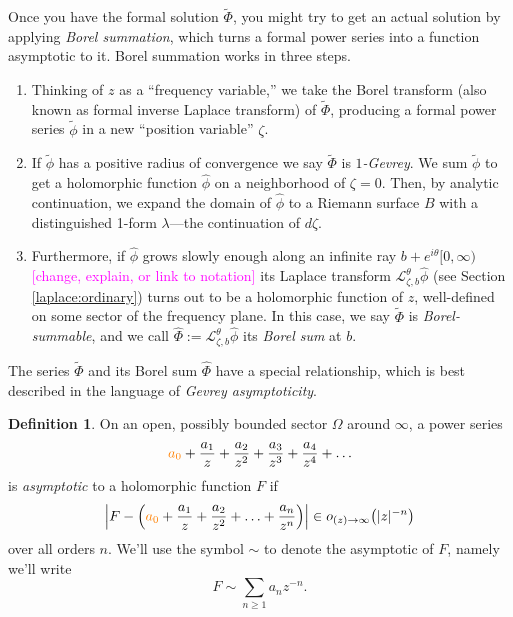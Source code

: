 \documentclass{article}
\let\Re\relax
\DeclareMathOperator{\Re}{Re}
\newcommand{\series}[1]{\tilde{#1}}
\newcommand{\laplace}{\mathcal{L}}
\theoremstyle{definition}
\newtheorem{defn}{Definition}
\theoremstyle{plain}
\begin{document}
Once you have the formal solution $\series{\Phi}$, you might try to get an actual solution by applying {\em Borel summation}, which turns a formal power series into a function asymptotic to it. Borel summation works in three steps.
\begin{enumerate}
\item Thinking of $z$ as a ``frequency variable,'' we take the Borel transform (also known as formal inverse Laplace transform) of $\series{\Phi}$, producing a formal power series $\series{\phi}$ in a new ``position variable'' $\zeta$.
\item If $\series{\phi}$ has a positive radius of convergence we say $\series{\Phi}$ is {\em $1$-Gevrey}. We sum $\series{\phi}$ to get a holomorphic function $\hat{\phi}$ on a neighborhood of $\zeta = 0$. Then, by analytic continuation, we expand the domain of $\hat{\phi}$ to a Riemann surface $B$ with a distinguished 1-form $\lambda$---the continuation of $d\zeta$. %
\item Furthermore, if $\hat{\phi}$ grows slowly enough along an infinite ray $b + e^{i\theta}[0, \infty)$ \textcolor{magenta}{[change, explain, or link to notation]} its Laplace transform $\laplace_{\zeta,b}^\theta \hat{\phi}$ (see Section \ref{laplace:ordinary}) turns out to be a holomorphic function of $z$, well-defined on some sector of the frequency plane. In this case, we say $\tilde{\Phi}$ is {\em Borel-summable}, and we call $\hat{\Phi}:=\laplace_{\zeta,b}^\theta \hat{\phi}$ its {\em Borel sum} at $b$. 
\end{enumerate}
The series $\series{\Phi}$ and its Borel sum $\hat{\Phi}$ have a special relationship, which is best described in the language of {\em Gevrey asymptoticity}. %
\begin{defn}
On an open, possibly bounded sector $\Omega$ around $\infty$, a power series
\begin{equation}\label{series:asymp-defn}
\textcolor{orange}{a_0}+\frac{a_1}{z} + \frac{a_2}{z^2} + \frac{a_3}{z^3} + \frac{a_4}{z^4} + \ldots
\end{equation}
is {\em asymptotic} to a holomorphic function $F$ if
\[ \left|F - \left(\textcolor{orange}{a_0}+\frac{a_1}{z} + \frac{a_2}{z^2} + \ldots + \frac{a_n}{z^n} \right) \right| \in o_{\Re(z) \to \infty}\big(|z|^{-n}\big) \]
over all orders $n$. We'll use the symbol $\sim$ to denote the asymptotic of $F$, namely we'll write \[F\sim \sum_{n\geq 1} a_n z^{-n}.\]
\end{defn}
\end{document}
